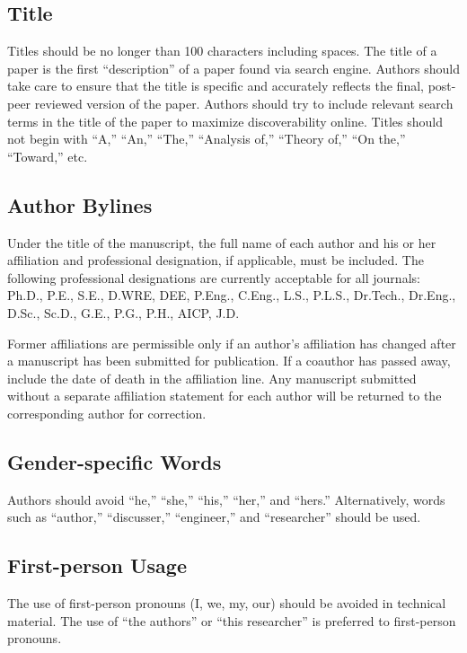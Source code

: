 \documentclass[Journal,letterpaper]{ascelike-new}
\begin{document}
\subsection{Title}

Titles should be no longer than 100 characters including spaces. The title of a paper is the first ``description'' of a paper found via search engine. Authors should take care to ensure that the title is specific and accurately reflects the final, post-peer reviewed version of the paper. Authors should try to include relevant search terms in the title of the paper to maximize discoverability online.
Titles should not begin with ``A,'' ``An,'' ``The,'' ``Analysis of,'' ``Theory of,'' ``On the,'' ``Toward,'' etc. 

\subsection{Author Bylines}

Under the title of the manuscript, the full name of each author and his or her affiliation and professional designation, if applicable, must be included. The following professional designations are currently acceptable for all journals: Ph.D., P.E., S.E., D.WRE, DEE, P.Eng., C.Eng., L.S., P.L.S., Dr.Tech., Dr.Eng., D.Sc., Sc.D., G.E., P.G., P.H., AICP, J.D.

Former affiliations are permissible only if an author's affiliation has changed after a manuscript has been submitted for publication. If a coauthor has passed away, include the date of death in the affiliation line. Any manuscript submitted without a separate affiliation statement for each author will be returned to the corresponding author for correction.

\subsection{Gender-specific Words}
Authors should avoid ``he,'' ``she,'' ``his,'' ``her,'' and ``hers.'' Alternatively, words such as ``author,'' ``discusser,'' ``engineer,'' and ``researcher'' should be used.

\subsection{First-person Usage}

The use of first-person pronouns (I, we, my, our) should be avoided in technical material. The use of ``the authors'' or ``this researcher'' is preferred to first-person pronouns.
\end{document}
